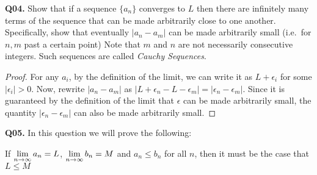 \documentclass[11pt]{article}
\begin{document}
\textbf{Q04.}
Show that if a sequence $\{a_n\}$ converges to $L$ then there are infinitely many terms of the sequence that can be made arbitrarily close to one another.
Specifically, show that eventually $|a_n-a_m|$ can be made arbitrarily small (i.e.\ for $n,m$ past a certain point)
Note that $m$ and $n$ are not necessarily consecutive integers.
Such sequences are called \emph{Cauchy Sequences}.
\begin{proof}
  For any $a_i$, by the definition of the limit, we can write it as $L+\epsilon_i$ for some $|\epsilon_i|>0$.
  Now, rewrite $|a_n-a_m|$ as $|L+\epsilon_n-L-\epsilon_m|=|\epsilon_n-\epsilon_m|$.
  Since it is guaranteed by the definition of the limit that $\epsilon$ can be made arbitrarily small, the quantity $|\epsilon_n-\epsilon_m|$ can also be made arbitrarily small.
\end{proof}



\textbf{Q05.}
In this question we will prove the following:
\begin{center}
  If $\displaystyle\lim_{n\to\infty}a_n=L$, $\displaystyle\lim_{n\to\infty}b_n=M$ and $a_n \leq b_n$ for all $n$, then it must be the case that $L \leq M$
\end{center}
\end{document}
